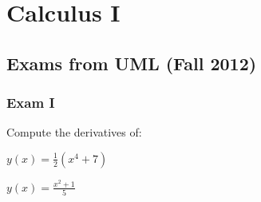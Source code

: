 \documentclass[crop=false,class=article,oneside]{standalone}
\begin{document}
    \ifx\ifmathcoursescalculusI\undefined
        \section*{Calculus I}
        \setcounter{section}{1}
    \fi
    \subsection{Exams from UML (Fall 2012)}
        \subsubsection{Exam I}
            \begin{problem}
                Compute the derivatives of:
                \begin{enumerate}[label=(\alph*)]
                    \begin{multicols}{2}
                        \item $y(x)=\frac{1}{2}(x^{4}+7)$
                        \item $y(x)=\frac{x^{2}+1}{5}$
                    \end{multicols}
                \end{enumerate}
            \end{problem}
\end{document}
